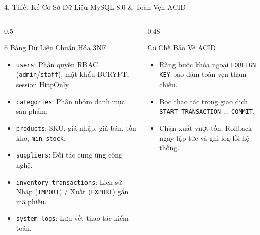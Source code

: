 \documentclass[aspectratio=169,10pt]{beamer}
\begin{document}
\begin{frame}[fragile]{4. Thiết Kế Cơ Sở Dữ Liệu MySQL 8.0 \& Toàn Vẹn ACID}
    \begin{columns}[T]
        \begin{column}{0.5\textwidth}
            \begin{block}{6 Bảng Dữ Liệu Chuẩn Hóa 3NF}
                \begin{itemize}
                    \item \texttt{users}: Phân quyền RBAC (\texttt{admin}/\texttt{staff}), mật khẩu BCRYPT, session HttpOnly.
                    \item \texttt{categories}: Phân nhóm danh mục sản phẩm.
                    \item \texttt{products}: SKU, giá nhập, giá bán, tồn kho, \texttt{min\_stock}.
                    \item \texttt{suppliers}: Đối tác cung ứng công nghệ.
                    \item \texttt{inventory\_transactions}: Lịch sử Nhập (\texttt{IMPORT}) / Xuất (\texttt{EXPORT}) gắn mã phiếu.
                    \item \texttt{system\_logs}: Lưu vết thao tác kiểm toán.
                \end{itemize}
            \end{block}
        \end{column}

        \begin{column}{0.48\textwidth}
            \begin{exampleblock}{Cơ Chế Bảo Vệ ACID}
                \begin{itemize}
                    \item Ràng buộc khóa ngoại \texttt{FOREIGN KEY} bảo đảm toàn vẹn tham chiếu.
                    \item Bọc thao tác trong giao dịch \texttt{START TRANSACTION} ... \texttt{COMMIT}.
                    \item Chặn xuất vượt tồn: Rollback ngay lập tức và ghi log lỗi hệ thống.
                \end{itemize}
            \end{exampleblock}
        \end{column}
    \end{columns}
\end{frame}
\end{document}

